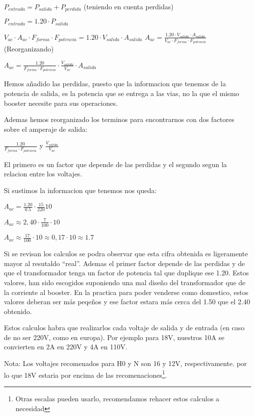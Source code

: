 $ P_{entrada} = P_{salida} + P_{perdida} $ (teniendo en cuenta perdidas)

$ P_{entrada} = 1.20 \cdot P_{salida} $

$ V_{ac} \cdot A_{ac} \cdot F_{forma} \cdot F_{potencia} = 1.20 \cdot V_{salida}\cdot A_{salida}$
$ A_{ac} = \frac{1.20 \cdot V_{salida}\cdot A_{salida}}{V_{ac} \cdot F_{forma} \cdot F_{potencia}} $ (Reorganizando)

$ A_{ac} = \frac{1.20}{F_{forma} \cdot F_{potencia}} \cdot\frac{V_{salida} }{V_{ac}} \cdot A_{salida} $

Hemos añadido las perdidas, puesto que la informacion que tenemos de la potencia de salida, es la potencia que se entrega a las vias, no la que  el mismo booster necesite para sus operaciones.

Ademas hemos reorganizado los terminos para encontrarnos con dos factores sobre el amperaje de salida:

$\frac{1.20}{F_{forma} \cdot F_{potencia}}$ y $\frac{V_{salida} }{V_{ac}} $

El primero es un factor que depende de las perdidas  y el segundo segun la relacion entre los voltajes.

Si sustimos la informacion que tenemos nos queda:

$A_{ac} =  \frac{1.20}{0.5}\cdot\frac{15}{220}{10}$

$A_{ac} \approx  2,40\cdot\frac{7}{100}\cdot {10}$

$A_{ac} \approx \frac{17}{100}\cdot{10} \approx 0,17\cdot 10 \approx 1.7$

Si se revisan los calculos se podra observar que esta cifra obtenida es ligeramente mayor al resutaldo ``real''. Ademas el primer factor depende de las perdidas y de que el transformador tenga un factor de potencia tal que duplique ese 1.20.
Estos valores, han sido escogidos suponiendo una mal diseño del transformador que de la corriente al booster. En la practica para poder venderse como domestico, estos valores deberan ser más peqeños y ese factor estara más cerca del 1.50 que el 2.40 obtenido.

Estos calculos habra que realizarlos cada voltaje de salida y de entrada (en caso de no ser 220V, como en europa). Por ejemplo para 18V, nuestros 10A se convierten en 2A en 220V y 4A en 110V.

Nota: Los voltajes recomenados para H0 y N son 16 y 12V, respectivamente. por lo que 18V estaria por encima de las recomenaciones\footnote{Otras escalas pueden usarlo, recomendamos rehacer estos calculos a necesidad}.

